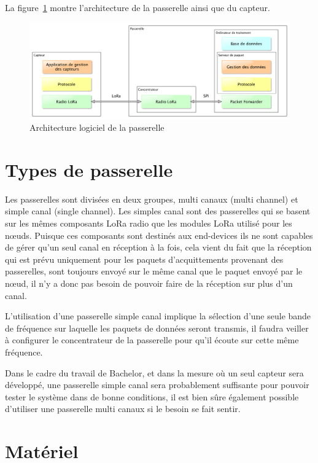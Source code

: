 La figure~\ref{fig:archi_passerelle} montre l'architecture de la passerelle ainsi que du capteur.

\begin{figure}[htb]
\centering 
\includegraphics[width=1\columnwidth]{../images/capteur_lora.png} 
\caption[Architecture passerelle]{Architecture logiciel de la passerelle}
\label{fig:archi_passerelle}
\end{figure}

\section{Types de passerelle}

Les passerelles sont divisées en deux groupes, multi canaux (multi channel) et simple canal (single channel). Les simples canal sont des passerelles qui se basent sur les mêmes composants LoRa radio que les modules LoRa utilisé pour les nœuds. Puisque ces composants sont destinés aux end-devices ils ne sont capables de gérer qu’un seul canal en réception à la fois, cela vient du fait que la réception qui est prévu uniquement pour les paquets d’acquittements provenant des passerelles, sont toujours envoyé sur le même canal que le paquet envoyé par le nœud, il n’y a donc pas besoin de pouvoir faire de la réception sur plus d’un canal.

L’utilisation d’une passerelle simple canal implique la sélection d’une seule bande de fréquence sur laquelle les paquets de données seront transmis, il faudra veiller à configurer le concentrateur de la passerelle pour qu’il écoute sur cette même fréquence.

Dans le cadre du travail de Bachelor, et dans la mesure où un seul capteur sera développé, une passerelle simple canal sera probablement suffisante pour pouvoir tester le système dans de bonne conditions, il est bien sûre également possible d’utiliser une passerelle multi canaux si le besoin se fait sentir.

\section{Matériel}

